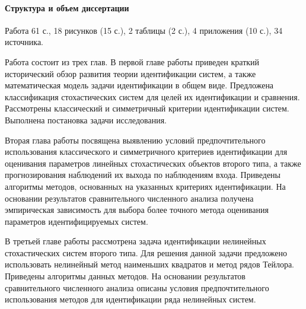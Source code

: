 \paragraph{Структура и объем диссертации}

Работа 61 с., 18 рисунков (15 с.), 2 таблицы (2 с.), 4 приложения (10 с.),
34 источника.

Работа состоит из трех глав.
В первой главе работы приведен краткий исторический обзор развития
теории идентификации систем, а также математическая модель задачи идентификации
в общем виде. Предложена классификация стохастических систем для целей
их идентификации и сравнения. Рассмотрены классический и симметричный
критерии идентификации систем. Выполнена постановка задачи исследования.

Вторая глава работы посвящена выявлению условий предпочтительного использования
классического и симметричного критериев идентификации для
оценивания параметров линейных стохастических объектов второго типа,
а также прогнозирования наблюдений их выхода по наблюдениям входа.
Приведены алгоритмы методов, основанных на указанных критериях идентификации.
На основании результатов сравнительного численного анализа получена эмпирическая
зависимость для выбора более точного метода оценивания параметров
идентифицируемых систем.

В третьей главе работы рассмотрена задача идентификации нелинейных
стохастических систем второго типа.
Для решения данной задачи предложено использовать нелинейный метод
наименьших квадратов и метод рядов Тейлора.
Приведены алгоритмы данных методов.
На основании результатов сравнительного численного анализа описаны условия
предпочтительного использования методов для идентификации ряда нелинейных систем.
